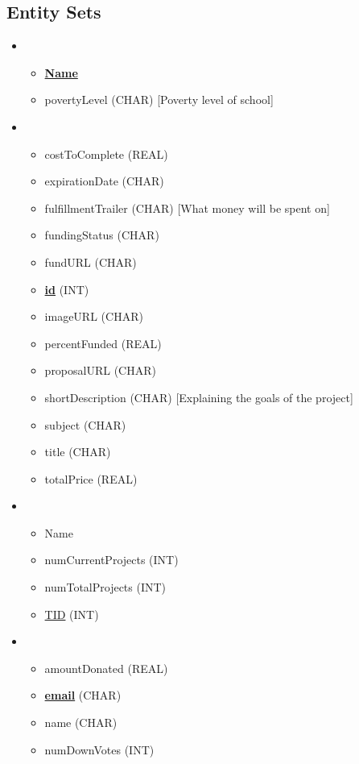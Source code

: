 \documentclass{article}
\begin{document}
\subsection{Entity Sets} %
\label{sub:entity_sets}
\begin{itemize}
  \item {}
  \begin{itemize}
    \item \textbf{\underline{Name}}
    \item povertyLevel (CHAR) [Poverty level of school]
  \end{itemize}
  \item {}
  \begin{itemize}
    \item costToComplete (REAL)
    \item expirationDate (CHAR)
    \item fulfillmentTrailer (CHAR) [What money will be spent on]
    \item fundingStatus (CHAR)
    \item fundURL (CHAR)
    \item \textbf{\underline{id}} (INT)
    \item imageURL (CHAR)
    \item percentFunded (REAL)
    \item proposalURL (CHAR)
    \item shortDescription (CHAR) [Explaining the goals of the project]
    \item subject (CHAR)
    \item title (CHAR)
    \item totalPrice (REAL)
  \end{itemize}
  \item {}
  \begin{itemize}
    \item Name
    \item numCurrentProjects (INT)
    \item numTotalProjects (INT)
    \item \underline{TID} (INT)
  \end{itemize}
  \item {}
  \begin{itemize}
    \item amountDonated (REAL)
    \item \textbf{\underline{email}} (CHAR)
    \item name (CHAR)
    \item numDownVotes (INT)

\end{itemize}
\end{itemize}
\end{document}
